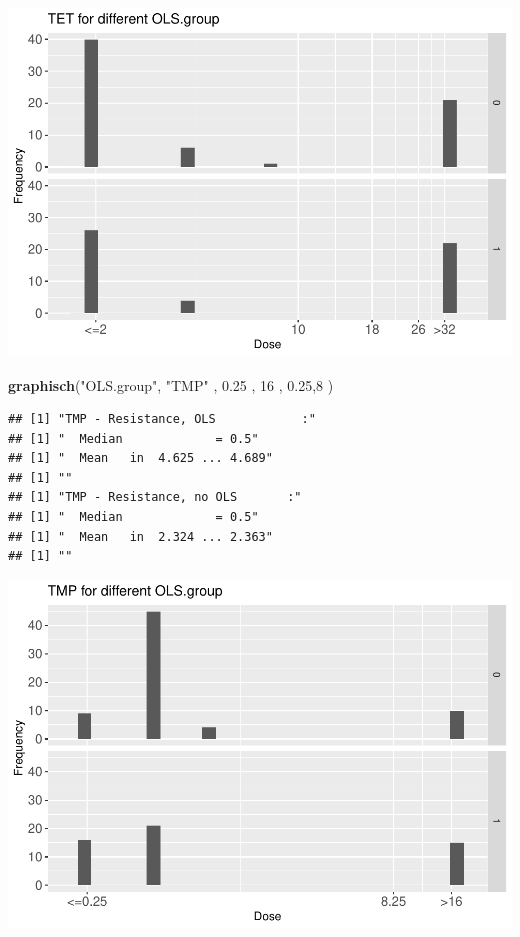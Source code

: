 \documentclass[
]{article}
\newenvironment{Shaded}{\begin{snugshade}}{\end{snugshade}}
\newcommand{\DecValTok}[1]{\textcolor[rgb]{0.00,0.00,0.81}{#1}}
\newcommand{\FloatTok}[1]{\textcolor[rgb]{0.00,0.00,0.81}{#1}}
\newcommand{\KeywordTok}[1]{\textcolor[rgb]{0.13,0.29,0.53}{\textbf{#1}}}
\newcommand{\NormalTok}[1]{#1}
\newcommand{\StringTok}[1]{\textcolor[rgb]{0.31,0.60,0.02}{#1}}
\begin{document}
\includegraphics{Verteilungen_files/figure-latex/unnamed-chunk-28-1.pdf}

\begin{Shaded}
\begin{Highlighting}[]
  \KeywordTok{graphisch}\NormalTok{(}\StringTok{"OLS.group"}\NormalTok{, }\StringTok{"TMP"}\NormalTok{ , }\FloatTok{0.25}\NormalTok{ ,  }\DecValTok{16}\NormalTok{   ,   }\FloatTok{0.25}\NormalTok{,}\DecValTok{8}\NormalTok{    ) }
\end{Highlighting}
\end{Shaded}

\begin{verbatim}
## [1] "TMP - Resistance, OLS            :"
## [1] "  Median             = 0.5"
## [1] "  Mean   in  4.625 ... 4.689"
## [1] ""
## [1] "TMP - Resistance, no OLS       :"
## [1] "  Median             = 0.5"
## [1] "  Mean   in  2.324 ... 2.363"
## [1] ""
\end{verbatim}

\includegraphics{Verteilungen_files/figure-latex/unnamed-chunk-29-1.pdf}
\end{document}
